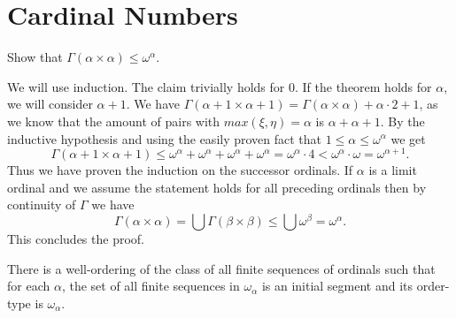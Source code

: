 \section{Cardinal Numbers}

\setcounter{problem}{4}
\begin{problem}
  Show that $\Gamma (\alpha \times \alpha) \le \omega^{\alpha}$.
\end{problem}

\begin{solution}
  We will use induction.
  The claim trivially holds for $0$.
  If the theorem holds for $\alpha$, we will consider $\alpha + 1$.
  We have $\Gamma(\alpha + 1 \times \alpha + 1) = \Gamma(\alpha \times \alpha) + \alpha \cdot 2 + 1$, as we know that the amount of pairs with $max(\xi, \eta) = \alpha$ is $\alpha + \alpha + 1$.
  By the inductive hypothesis and using the easily proven fact that $1 \le \alpha \le \omega^{\alpha}$ we get
  \[\Gamma(\alpha + 1 \times \alpha + 1) \le \omega^{\alpha} + \omega^{\alpha} + \omega^{\alpha} + \omega^{\alpha} = \omega^{\alpha} \cdot 4 < \omega^{\alpha} \cdot \omega = \omega^{\alpha + 1}.\]
  Thus we have proven the induction on the successor ordinals.
  If $\alpha$ is a limit ordinal and we assume the statement holds for all preceding ordinals then by continuity of $\Gamma$ we have
  \[\Gamma(\alpha \times \alpha) = \bigcup \Gamma(\beta \times \beta) \le \bigcup \omega^{\beta} = \omega^{\alpha}.\]
  This concludes the proof.
\end{solution}

\begin{problem}
  There is a well-ordering of the class of all finite sequences of ordinals such that for each $\alpha$, the set of all finite sequences in $\omega_{\alpha}$ is an initial segment and its order-type is $\omega_{\alpha}$.
\end{problem}


